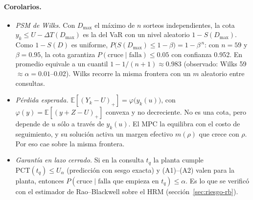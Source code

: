 \paragraph{Corolarios.}
\begin{itemize}
\item \emph{PSM de Wilks.} Con $D_{\max}$ el máximo de $n$ sorteos independientes, la cota
  $y_k\le U-\Delta T(D_{\max})$ es la del VaR con un nivel aleatorio $1-S(D_{\max})$. Como
  $1-S(D)$ es uniforme, $P\big(S(D_{\max})\le1-\beta\big)=1-\beta^{\,n}$: con $n=59$ y $\beta=0.95$,
  la cota garantiza $P(\text{cruce}\mid\text{falla})\le0.05$ con confianza 0.952. En promedio
  equivale a un cuantil $1-1/(n+1)\approx0.983$ (observado: Wilks 59 $\approx\alpha=0.01$--0.02).
  Wilks recorre la misma frontera con un $m$ aleatorio entre consultas.
\item \emph{Pérdida esperada.} $\mathbb E[(Y_k-U)_+]=\varphi\big(y_k(u)\big)$, con
  $\varphi(y)=\mathbb E[(y+Z-U)_+]$ convexa y no decreciente. No es una cota, pero depende de $u$
  sólo a través de $y_k(u)$. El MPC la equilibra con el costo de seguimiento, y su solución
  activa un margen efectivo $m(\rho)$ que crece con $\rho$. Por eso cae sobre la misma frontera.
\item \emph{Garantía en lazo cerrado.} Si en la consulta $t_q$ la planta cumple
  $\mathrm{PCT}(t_q)\le U_\alpha$ (predicción con sesgo exacta) y (A1)--(A2) valen para la planta,
  entonces $P(\text{cruce}\mid\text{falla que empieza en }t_q)\le\alpha$. Es lo que se verificó con
  el estimador de Rao--Blackwell sobre el HRM (sección~\ref{sec:riesgo-rb}).
\end{itemize}

